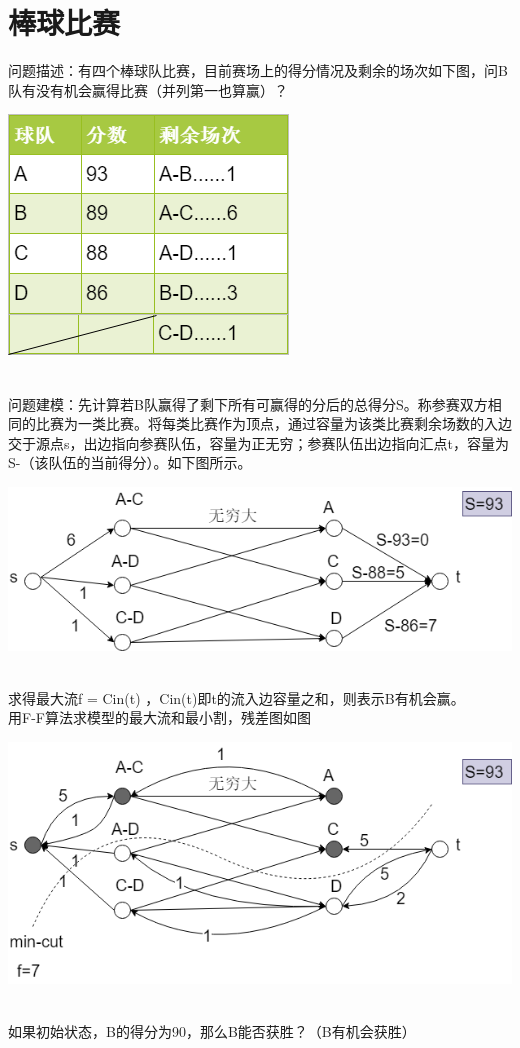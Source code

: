 \section{棒球比赛}
问题描述：有四个棒球队比赛，目前赛场上的得分情况及剩余的场次如下图，问B队有没有机会赢得比赛（并列第一也算赢）？\\
\centerline{\includegraphics[scale=0.6]{Ln11.image/networkflow5.png}}
\\问题建模：先计算若B队赢得了剩下所有可赢得的分后的总得分S。称参赛双方相同的比赛为一类比赛。将每类比赛作为顶点，通过容量为该类比赛剩余场数的入边交于源点s，出边指向参赛队伍，容量为正无穷；参赛队伍出边指向汇点t，容量为S-（该队伍的当前得分）。如下图所示。\\
\centerline{\includegraphics[scale=0.6]{Ln11.image/networkflow6.png}}
\\求得最大流f = Cin(t) ，Cin(t)即t的流入边容量之和，则表示B有机会赢。
\\用F-F算法求模型的最大流和最小割，残差图如图\\
\centerline{\includegraphics[scale=0.6]{Ln11.image/networkflow7.png}}
\\如果初始状态，B的得分为90，那么B能否获胜？（B有机会获胜）

